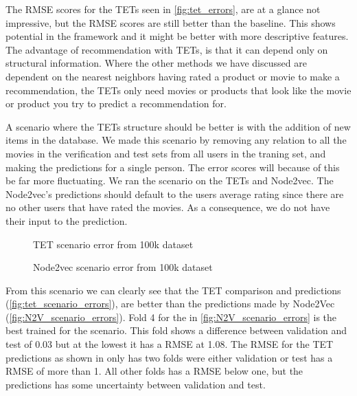 The RMSE scores for the TETs seen in \autoref{fig:tet_errors}, are at a glance not impressive, but the RMSE scores are still better than the baseline. 
This shows potential in the framework and it might be better with more descriptive features. The advantage of recommendation with TETs, is that it can depend only on structural information.
Where the other methods we have discussed are dependent on the nearest neighbors having rated a product or movie to make a recommendation, the TETs only need movies or products that look like the movie or product you try to predict a recommendation for.

A scenario where the TETs structure should be better is with the addition of new items in the database.
We made this scenario by removing any relation to all the movies in the verification and test sets from all users in the traning set, and making the predictions for a single person.
The error scores will because of this be far more fluctuating.
We ran the scenario on the TETs and Node2vec.
The Node2vec's predictions should default to the users average rating since there are no other users that have rated the movies. As a consequence, we do not have their input to the prediction.

\begin{figure}[H]
	\centering
	\begin{adjustbox}{width=0.5\textwidth}
		
	\end{adjustbox}
	\caption{TET scenario error from 100k dataset}
	\label{fig:tet_scenario_errors}
\end{figure}

\begin{figure}[H]
	\centering
	\begin{adjustbox}{width=0.5\textwidth}
		
	\end{adjustbox}
	\caption{Node2vec scenario error from 100k dataset}
	\label{fig:N2V_scenario_errors}
\end{figure}

From this scenario we can clearly see that the TET comparison and predictions (\autoref{fig:tet_scenario_errors}), are better than the predictions made by Node2Vec (\autoref{fig:N2V_scenario_errors}).
Fold 4 for the in \autoref{fig:N2V_scenario_errors} is the best trained for the scenario.
This fold shows a difference between validation and test of 0.03 but at the lowest it has a RMSE at 1.08.
The RMSE for the TET predictions  as shown in  only has two folds were either validation or test has a RMSE of more than 1.
All other folds has a RMSE below one, but the predictions has some uncertainty between validation and test.


